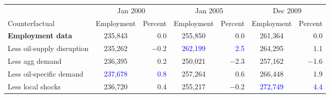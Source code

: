 
\begin{tabular}{lcrcrcr}
\toprule
\multicolumn{1}{c}{ } & \multicolumn{2}{c}{Jan 2000} & \multicolumn{2}{c}{Jan 2005} & \multicolumn{2}{c}{Dec 2009} \\
\cmidrule(l{3pt}r{3pt}){2-3} \cmidrule(l{3pt}r{3pt}){4-5} \cmidrule(l{3pt}r{3pt}){6-7}
Counterfactual & Employment & Percent & Employment & Percent & Employment & Percent\\
\midrule
\textbf{Employment data} & 235,843 & 0.0 & 255,850 & 0.0 & 261,364 & 0.0\\
Less oil-supply disruption & 235,262 & $-$0.2 & \textcolor{blue}{262,199} & \textcolor{blue}{2.5} & 264,295 & 1.1\\
Less agg demand & 236,395 & 0.2 & 250,021 & $-$2.3 & 257,162 & $-$1.6\\
Less oil-specific demand & \textcolor{blue}{237,678} & \textcolor{blue}{0.8} & 257,264 & 0.6 & 266,448 & 1.9\\
Less local shocks & 236,720 & 0.4 & 255,217 & $-$0.2 & \textcolor{blue}{272,749} & \textcolor{blue}{4.4}\\
\bottomrule
\end{tabular}
